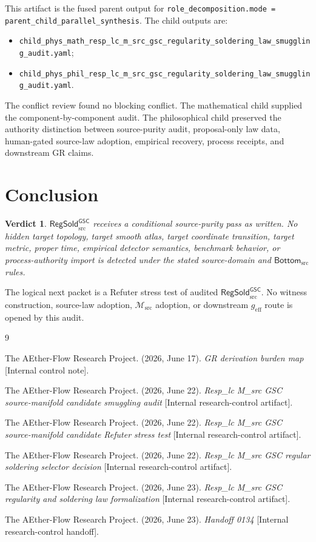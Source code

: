 \documentclass[11pt]{article}
\newcommand{\Msrc}{\mathcal{M}_{\mathrm{src}}}
\newcommand{\geff}{g_{\mathrm{eff}}}
\newcommand{\RegSold}{\mathsf{RegSold}_{\mathrm{src}}^{\mathsf{GSC}}}
\newcommand{\BottomSrc}{\mathsf{Bottom}_{\mathrm{src}}}
\newtheorem{verdict}{Verdict}
\begin{document}
This artifact is the fused parent output for
\texttt{role\_decomposition.mode = parent\_child\_parallel\_synthesis}. The
child outputs are:
\begin{itemize}
  \item \texttt{child\_phys\_math\_resp\_lc\_m\_src\_gsc\_regularity\_soldering\_law\_smuggling\_audit.yaml};
  \item \texttt{child\_phys\_phil\_resp\_lc\_m\_src\_gsc\_regularity\_soldering\_law\_smuggling\_audit.yaml}.
\end{itemize}
The conflict review found no blocking conflict. The mathematical child
supplied the component-by-component audit. The philosophical child preserved
the authority distinction between source-purity audit, proposal-only law data,
human-gated source-law adoption, empirical recovery, process receipts, and
downstream GR claims.

\section{Conclusion}

\begin{verdict}
\(\RegSold\) receives a conditional source-purity pass as written. No hidden
target topology, target smooth atlas, target coordinate transition, target
metric, proper time, empirical detector semantics, benchmark behavior, or
process-authority import is detected under the stated source-domain and
\(\BottomSrc\) rules.
\end{verdict}

The logical next packet is a Refuter stress test of audited \(\RegSold\). No
witness construction, source-law adoption, \(\Msrc\) adoption, or downstream
\(\geff\) route is opened by this audit.

\begin{thebibliography}{9}

The AEther-Flow Research Project. (2026, June 17). \emph{GR derivation
burden map} [Internal control note].

The AEther-Flow Research Project. (2026, June 22). \emph{Resp\_lc M\_src
GSC source-manifold candidate smuggling audit}
[Internal research-control artifact].

The AEther-Flow Research Project. (2026, June 22). \emph{Resp\_lc M\_src
GSC source-manifold candidate Refuter stress test}
[Internal research-control artifact].

The AEther-Flow Research Project. (2026, June 22). \emph{Resp\_lc M\_src
GSC regular soldering selector decision}
[Internal research-control artifact].

The AEther-Flow Research Project. (2026, June 23). \emph{Resp\_lc M\_src
GSC regularity and soldering law formalization}
[Internal research-control artifact].

The AEther-Flow Research Project. (2026, June 23). \emph{Handoff 0134}
[Internal research-control handoff].

\end{thebibliography}
\end{document}
